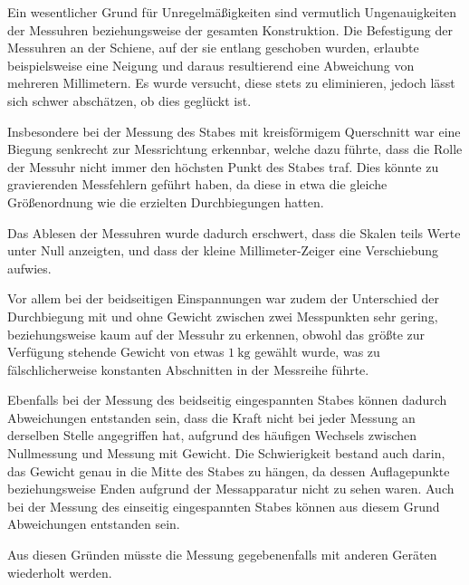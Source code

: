 Ein wesentlicher Grund für Unregelmäßigkeiten sind vermutlich Ungenauigkeiten der Messuhren beziehungsweise der gesamten Konstruktion.
Die Befestigung der Messuhren an der Schiene, auf der sie entlang geschoben wurden,
erlaubte beispielsweise eine Neigung und daraus resultierend eine Abweichung von mehreren Millimetern.
Es wurde versucht, diese stets zu eliminieren, jedoch lässt sich schwer abschätzen, ob dies geglückt ist.

Insbesondere bei der Messung des Stabes mit kreisförmigem Querschnitt war eine Biegung senkrecht zur Messrichtung erkennbar, welche dazu führte, dass die Rolle der Messuhr nicht immer den höchsten Punkt des Stabes traf. Dies könnte zu gravierenden Messfehlern geführt haben, da diese in etwa die gleiche Größenordnung wie die erzielten Durchbiegungen hatten.

Das Ablesen der Messuhren wurde dadurch erschwert, dass die Skalen teils Werte unter Null anzeigten,
und dass der kleine Millimeter-Zeiger eine Verschiebung aufwies.

Vor allem bei der beidseitigen Einspannungen war zudem der Unterschied der Durchbiegung mit und ohne Gewicht zwischen zwei Messpunkten sehr gering,
beziehungsweise kaum auf der Messuhr zu erkennen,
obwohl das größte zur Verfügung stehende Gewicht von etwas $\SI{1}{\kilo\gram}$ gewählt wurde,
was zu fälschlicherweise konstanten Abschnitten in der Messreihe führte.

Ebenfalls bei der Messung des beidseitig eingespannten Stabes können dadurch Abweichungen entstanden sein,
dass die Kraft nicht bei jeder Messung an derselben Stelle angegriffen hat,
aufgrund des häufigen Wechsels zwischen Nullmessung und Messung mit Gewicht.
Die Schwierigkeit bestand auch darin, das Gewicht genau in die Mitte des Stabes zu hängen,
da dessen Auflagepunkte beziehungsweise Enden aufgrund der Messapparatur nicht zu sehen waren.
Auch bei der Messung des einseitig eingespannten Stabes können aus diesem Grund Abweichungen entstanden sein.

Aus diesen Gründen müsste die Messung gegebenenfalls mit anderen Geräten wiederholt werden. 

